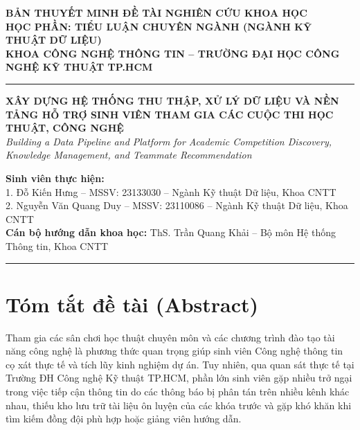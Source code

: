 \documentclass[11pt,a4paper]{article}
\begin{document}
\thispagestyle{plain}

\begin{center}
    {\fontsize{13pt}{15pt}\selectfont\bfseries BẢN THUYẾT MINH ĐỀ TÀI NGHIÊN CỨU KHOA HỌC}\\[4pt]
    {\normalsize\textbf{HỌC PHẦN: TIỂU LUẬN CHUYÊN NGÀNH (NGÀNH KỸ THUẬT DỮ LIỆU)}}\\[2pt]
    {\small\textbf{KHOA CÔNG NGHỆ THÔNG TIN -- TRƯỜNG ĐẠI HỌC CÔNG NGHỆ KỸ THUẬT TP.HCM}}
    \vspace{6pt}
    \hrule
    \vspace{8pt}
    {\fontsize{12pt}{14pt}\selectfont\bfseries XÂY DỰNG HỆ THỐNG THU THẬP, XỬ LÝ DỮ LIỆU VÀ NỀN TẢNG HỖ TRỢ SINH VIÊN THAM GIA CÁC CUỘC THI HỌC THUẬT, CÔNG NGHỆ}\\[3pt]
    {\small\textit{Building a Data Pipeline and Platform for Academic Competition Discovery, Knowledge Management, and Teammate Recommendation}}
\end{center}

\vspace{2pt}

\noindent\textbf{Sinh viên thực hiện:}\\
1. Đỗ Kiến Hưng \quad -- \quad MSSV: 23133030 \quad -- \quad Ngành Kỹ thuật Dữ liệu, Khoa CNTT\\
2. Nguyễn Văn Quang Duy \quad -- \quad MSSV: 23110086 \quad -- \quad Ngành Kỹ thuật Dữ liệu, Khoa CNTT\\[2pt]
\noindent\textbf{Cán bộ hướng dẫn khoa học:} ThS. Trần Quang Khải \quad -- \quad Bộ môn Hệ thống Thông tin, Khoa CNTT

\vspace{6pt}
\hrule
\vspace{6pt}

\section{Tóm tắt đề tài (Abstract)}
Tham gia các sân chơi học thuật chuyên môn và các chương trình đào tạo tài năng công nghệ là phương thức quan trọng giúp sinh viên Công nghệ thông tin cọ xát thực tế và tích lũy kinh nghiệm dự án. Tuy nhiên, qua quan sát thực tế tại Trường ĐH Công nghệ Kỹ thuật TP.HCM, phần lớn sinh viên gặp nhiều trở ngại trong việc tiếp cận thông tin do các thông báo bị phân tán trên nhiều kênh khác nhau, thiếu kho lưu trữ tài liệu ôn luyện của các khóa trước và gặp khó khăn khi tìm kiếm đồng đội phù hợp hoặc giảng viên hướng dẫn.
\end{document}
